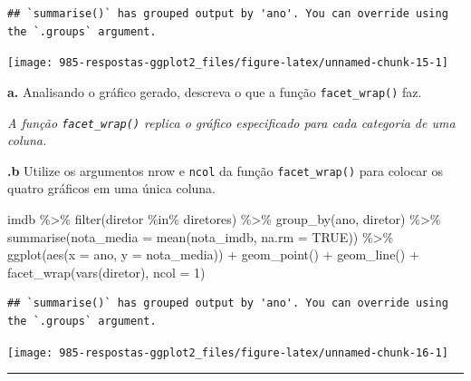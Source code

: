 \documentclass[
]{book}
\newenvironment{Shaded}{\begin{snugshade}}{\end{snugshade}}
\newcommand{\AttributeTok}[1]{\textcolor[rgb]{0.77,0.63,0.00}{#1}}
\newcommand{\ConstantTok}[1]{\textcolor[rgb]{0.00,0.00,0.00}{#1}}
\newcommand{\DecValTok}[1]{\textcolor[rgb]{0.00,0.00,0.81}{#1}}
\newcommand{\FunctionTok}[1]{\textcolor[rgb]{0.00,0.00,0.00}{#1}}
\newcommand{\NormalTok}[1]{#1}
\newcommand{\SpecialCharTok}[1]{\textcolor[rgb]{0.00,0.00,0.00}{#1}}
\begin{document}
\begin{verbatim}
## `summarise()` has grouped output by 'ano'. You can override using the `.groups` argument.
\end{verbatim}

\begin{center}\texttt{[image: 985-respostas-ggplot2\_files/figure-latex/unnamed-chunk-15-1]} \end{center}

\textbf{a.} Analisando o gráfico gerado, descreva o que a função \texttt{facet\_wrap()} faz.

\emph{A função \texttt{facet\_wrap()} replica o gráfico especificado para cada categoria de uma coluna.}

\textbf{.b} Utilize os argumentos nrow e \texttt{ncol} da função \texttt{facet\_wrap()} para colocar os quatro gráficos em uma única coluna.

\begin{Shaded}
\begin{Highlighting}[]
\NormalTok{imdb }\SpecialCharTok{\%\textgreater{}\%}
  \FunctionTok{filter}\NormalTok{(diretor }\SpecialCharTok{\%in\%}\NormalTok{ diretores) }\SpecialCharTok{\%\textgreater{}\%}
  \FunctionTok{group\_by}\NormalTok{(ano, diretor) }\SpecialCharTok{\%\textgreater{}\%}
  \FunctionTok{summarise}\NormalTok{(}\AttributeTok{nota\_media =} \FunctionTok{mean}\NormalTok{(nota\_imdb, }\AttributeTok{na.rm =} \ConstantTok{TRUE}\NormalTok{)) }\SpecialCharTok{\%\textgreater{}\%}
  \FunctionTok{ggplot}\NormalTok{(}\FunctionTok{aes}\NormalTok{(}\AttributeTok{x =}\NormalTok{ ano, }\AttributeTok{y =}\NormalTok{ nota\_media)) }\SpecialCharTok{+}
  \FunctionTok{geom\_point}\NormalTok{() }\SpecialCharTok{+}
  \FunctionTok{geom\_line}\NormalTok{() }\SpecialCharTok{+}
  \FunctionTok{facet\_wrap}\NormalTok{(}\FunctionTok{vars}\NormalTok{(diretor), }\AttributeTok{ncol =} \DecValTok{1}\NormalTok{)}
\end{Highlighting}
\end{Shaded}

\begin{verbatim}
## `summarise()` has grouped output by 'ano'. You can override using the `.groups` argument.
\end{verbatim}

\begin{center}\texttt{[image: 985-respostas-ggplot2\_files/figure-latex/unnamed-chunk-16-1]} \end{center}

\begin{center}\rule{0.5\linewidth}{0.5pt}\end{center}
\end{document}
